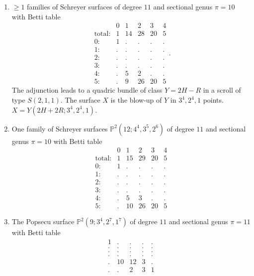 \documentclass[twoside,12pt, leqno]{amsart}
\def\PP{{\mathbb P}}
\begin{document}
\begin{enumerate}
 \item $\ge 1$ families of Schreyer surfaces of  degree $11$ and sectional genus $\pi=10$ with Betti table
$$\begin{matrix}
       & 0 & 1 & 2 & 3 & 4\\
      \text{total:} & 1 & 14 & 28 & 20 & 5\\
      0: & 1 & . & . & . & .\\
      1: & . & . & . & . & .\\
      2: & . & . & . & . & .\\
      3: & . & . & . & . & .\\
      4: & . & 5 & 2 & . & .\\
      5: & . & 9 & 26 & 20 & 5
      \end{matrix}.$$
The adjunction leads to a quadric bundle of class $Y=2H-R$ in a scroll of type $S(2,1,1)$. The surface $X$ is the blow-up of $Y$ in $3^{4},2^{4},1$ points.
$X=Y(2H+2R;3^{4},2^{4},1)$.

 
  
  \item One family of Schreyer surfaces $\PP^{2}(12;4^{4},3^{5},2^{6})$ of  degree $11$ and sectional genus $\pi=10$ with Betti table
$$\begin{matrix}
        & 0 & 1 & 2 & 3 & 4\\
       \text{total:} & 1 & 15 & 29 & 20 & 5\\
       0: & 1 & . & . & . & .\\
       1: & . & . & . & . & .\\
       2: & . & . & . & . & .\\
       3: & . & . & . & . & .\\
       4: & . & 5 & 3 & . & .\\
       5: & . & 10 & 26 & 20 & 5
       \end{matrix}$$
      
\item   The Popsecu surface $\PP^{2}(9;3^{4},2^{7},1^{7})$ of degree $11$ and sectional genus $\pi=11$ with Betti table
$$\begin{matrix}
 1 & . & . & . & .\\
 . & . & . & . & .\\
 . & . & . & . & .\\
 . & . & . & . & .\\
 . & 10 & 12 & 3 & .\\
 . & . & 2 & 3 & 1
      \end{matrix}$$


\end{enumerate}
\end{document}
